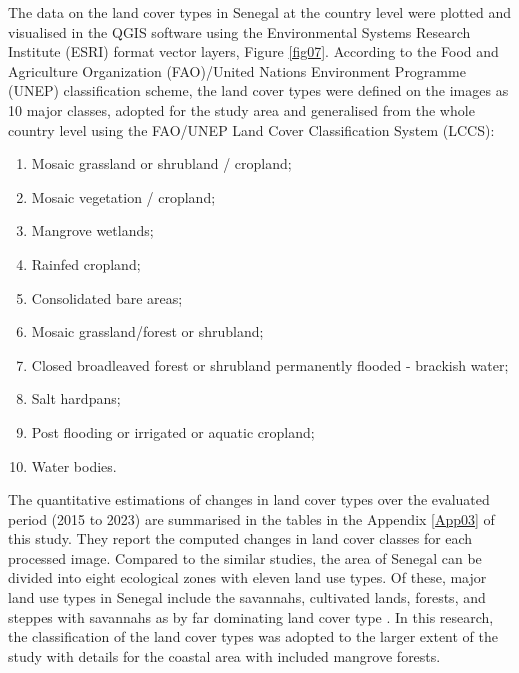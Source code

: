 \documentclass[earth,article,submit,pdftex,moreauthors]{Definitions/mdpi}
\begin{document}
The data on the land cover types in Senegal at the country level were plotted and visualised in the QGIS software using the Environmental Systems Research Institute (ESRI) format vector layers, Figure \ref{fig07}. According to the Food and Agriculture Organization (FAO)/United Nations Environment Programme (UNEP) classification scheme, the land cover types were defined on the images as 10 major classes, adopted for the study area and generalised from the whole country level using the FAO/UNEP Land Cover Classification System (LCCS): 

 \begin{enumerate}
        \item Mosaic grassland or shrubland / cropland; 
        \item Mosaic vegetation / cropland; 
        \item Mangrove wetlands; 
        \item Rainfed cropland; 
        \item Consolidated bare areas;
        \item Mosaic grassland/forest or shrubland; 
        \item Closed broadleaved forest or shrubland permanently flooded - brackish water; 
        \item Salt hardpans; 
        \item Post flooding or irrigated or aquatic cropland; 
        \item Water bodies. 
\end{enumerate}

The quantitative estimations of changes in land cover types over the evaluated period (2015 to 2023) are summarised in the tables in the Appendix \ref{App03} of this study. They report the computed changes in land cover classes for each processed image. Compared to the similar studies, the area of Senegal can be divided into eight ecological zones with eleven land use types. Of these, major land use types in Senegal include the savannahs, cultivated lands, forests, and steppes with savannahs as by far dominating land cover type \cite{WOOMER2004625}. In this research, the classification of the land cover types was adopted to the larger extent of the study with details for the coastal area with included mangrove forests.
\end{document}
